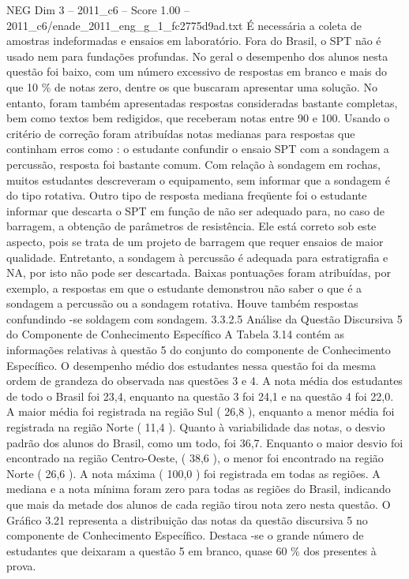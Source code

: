 \begin{textsample}{NEG Dim 3 – 2011\_c6 – Score 1.00 – 2011\_c6/enade\_2011\_eng\_g\_1\_fc2775d9ad.txt}
É necessária a coleta de amostras indeformadas e ensaios em laboratório.
Fora do Brasil, o SPT não é usado nem para fundações profundas.
No geral o desempenho dos alunos nesta questão foi baixo, com um número excessivo de respostas em branco e mais do que 10 \% de notas zero, dentre os que buscaram apresentar uma solução.
No entanto, foram também apresentadas respostas consideradas bastante completas, bem como textos bem redigidos, que receberam notas entre 90 e 100.
Usando o critério de correção foram atribuídas notas medianas para respostas que continham erros como : o estudante confundir o ensaio SPT com a sondagem a percussão, resposta foi bastante comum.
Com relação à sondagem em rochas, muitos estudantes descreveram o equipamento, sem informar que a sondagem é do tipo rotativa.
Outro tipo de resposta mediana freqüente foi o estudante informar que descarta o SPT em função de não ser adequado para, no caso de barragem, a obtenção de parâmetros de resistência.
Ele está correto sob este aspecto, pois se trata de um projeto de barragem que requer ensaios de maior qualidade.
Entretanto, a sondagem à percussão é adequada para estratigrafia e NA, por isto não pode ser descartada.
Baixas pontuações foram atribuídas, por exemplo, a respostas em que o estudante demonstrou não saber o que é a sondagem a percussão ou a sondagem rotativa.
Houve também respostas confundindo -se soldagem com sondagem. 3.3.2.5 Análise da Questão Discursiva 5 do Componente de Conhecimento Específico A Tabela 3.14 contém as informações relativas à questão 5 do conjunto do componente de Conhecimento Específico.
O desempenho médio dos estudantes nessa questão foi da mesma ordem de grandeza do observada nas questões 3 e 4.
A nota média dos estudantes de todo o Brasil foi 23,4, enquanto na questão 3 foi 24,1 e na questão 4 foi 22,0.
A maior média foi registrada na região Sul ( 26,8 ), enquanto a menor média foi registrada na região Norte ( 11,4 ).
Quanto à variabilidade das notas, o desvio padrão dos alunos do Brasil, como um todo, foi 36,7.
Enquanto o maior desvio foi encontrado na região Centro-Oeste, ( 38,6 ), o menor foi encontrado na região Norte ( 26,6 ).
A nota máxima ( 100,0 ) foi registrada em todas as regiões.
A mediana e a nota mínima foram zero para todas as regiões do Brasil, indicando que mais da metade dos alunos de cada região tirou nota zero nesta questão.
O Gráfico 3.21 representa a distribuição das notas da questão discursiva 5 no componente de Conhecimento Específico.
Destaca -se o grande número de estudantes que deixaram a questão 5 em branco, quase 60 \% dos presentes à prova.

\end{textsample}

